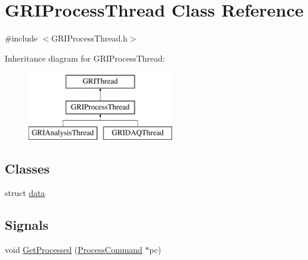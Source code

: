 \hypertarget{classGRIProcessThread}{\section{\-G\-R\-I\-Process\-Thread \-Class \-Reference}
\label{classGRIProcessThread}
}


{\ttfamily \#include $<$\-G\-R\-I\-Process\-Thread.\-h$>$}

\-Inheritance diagram for \-G\-R\-I\-Process\-Thread\-:\begin{figure}[H]
\begin{center}
\leavevmode
\includegraphics[height=3.000000cm]{classGRIProcessThread}
\end{center}
\end{figure}
\subsection*{\-Classes}
\begin{DoxyCompactItemize}
\item 
struct \hyperlink{structGRIProcessThread_1_1data}{data}
\end{DoxyCompactItemize}
\subsection*{\-Signals}
\begin{DoxyCompactItemize}
\item 
void \hyperlink{classGRIProcessThread_a7f07dd9108f2a47b05606c3df113ef5e}{\-Get\-Processed} (\hyperlink{structProcessCommand}{\-Process\-Command} $\ast$pc)
\end{DoxyCompactItemize}
